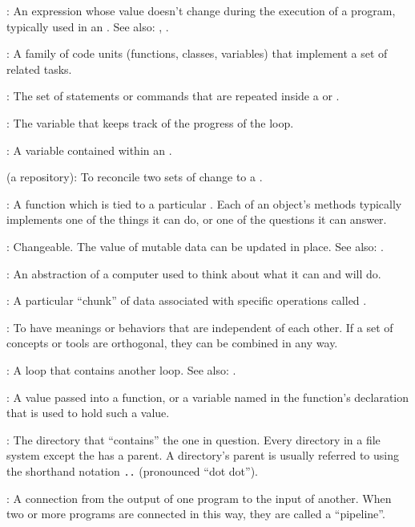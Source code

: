 :
An expression whose value doesn't change during the
execution of a program, typically used in an
. See also:
,
.

:
A family of code units (functions, classes, variables)
that implement a set of related tasks.

:
The set of statements or commands that are repeated inside a 
or .

:
The variable that keeps track of the progress of
the loop.

:
A variable contained within an
.

 (a repository):
To reconcile two sets of change to a
.

:
A function which is tied to a particular
. Each of an object's methods typically
implements one of the things it can do, or one of the questions it can
answer.

:
Changeable. The value of mutable data can be updated
in place. See also: .

:
An abstraction of a computer used to think
about what it can and will do.

:
A particular ``chunk'' of data associated with specific
operations called .

:
To have meanings or behaviors that are independent
of each other. If a set of concepts or tools are orthogonal, they can be
combined in any way.

:
A loop that contains another loop. See also:
.

:
A value passed into a function, or a variable named
in the function's declaration that is used to hold such a value.

:
The directory that ``contains'' the one in
question. Every directory in a file system except the
 has a parent. A directory's
parent is usually referred to using the shorthand notation \texttt{..}
(pronounced ``dot dot'').

:
A connection from the output of one program to the input
of another. When two or more programs are connected in this way, they
are called a ``pipeline''.

